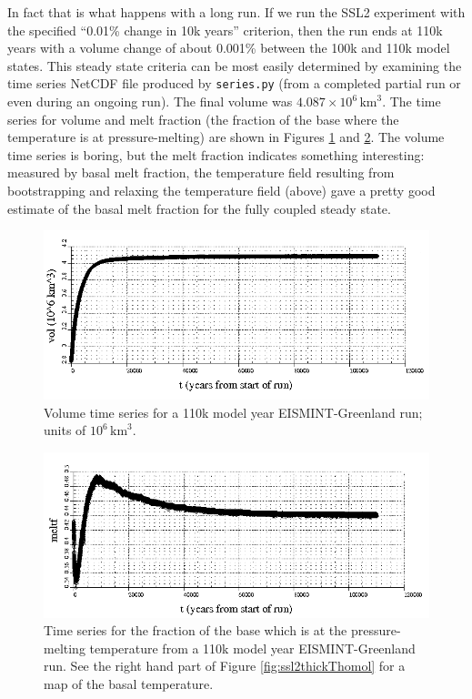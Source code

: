 \documentclass[11pt,final]{amsart}
\begin{document}
In fact that is what happens with a long run.  If we run the SSL2 experiment with the specified ``0.01\% change in 10k years'' criterion, then the run ends at 110k years with a volume change of about 0.001\% between the 100k and 110k model states.  This steady state criteria can be most easily determined by examining the time series NetCDF file produced by \verb|series.py| (from a completed partial run or even during an ongoing run).  The final volume was $4.087 \times 10^{6}\,\text{km}^3$.  The time series for volume and melt fraction (the fraction of the base where the temperature is at pressure-melting) are shown in Figures \ref{fig:eisgrnvolseries} and \ref{fig:eisgrnmeltfseries}.  The volume time series is boring, but the melt fraction indicates something interesting: measured by basal melt fraction, the temperature field resulting from bootstrapping and relaxing the temperature field (above) gave a pretty good estimate of the basal melt fraction for the fully coupled steady state.

\begin{figure}[ht]
\includegraphics[width=6.0in,keepaspectratio=true]{figs/eisgrn_volseries}
\caption{Volume time series for a 110k model year EISMINT-Greenland run; units of $10^{6}\,\text{km}^3$.}
\label{fig:eisgrnvolseries}
\end{figure}

\begin{figure}[ht]
\includegraphics[width=6.0in,keepaspectratio=true]{figs/eisgrn_meltfseries}
\caption{Time series for the fraction of the base which is at the pressure-melting temperature from a 110k model year EISMINT-Greenland run.  See the right hand part of Figure \ref{fig:ssl2thickThomol} for a map of the basal temperature.}
\label{fig:eisgrnmeltfseries}
\end{figure}
\end{document}
